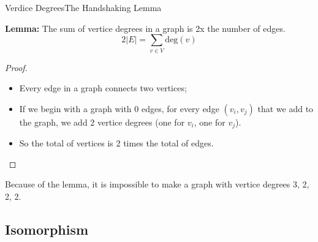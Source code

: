 \begin{frame}{Verdice Degrees}{The Handshaking Lemma}

  {\bf Lemma:} The sum of vertice degrees in a graph is 2x the number of edges.
  \begin{equation}
    2|E| = \sum_{v\in V} \text{deg}(v)
  \end{equation}

  \begin{proof}
    \begin{itemize}
      \item Every edge in a graph connects two vertices;
      \item If we begin with a graph with 0 edges, for every edge $(v_i,v_j)$ that we add to the graph, we add 2 vertice degrees (one for $v_i$, one for $v_j$).
      \item So the total of vertices is 2 times the total of edges.
    \end{itemize}
  \end{proof}\bigskip

  Because of the lemma, it is impossible to make a graph with vertice degrees 3, 2, 2, 2.
\end{frame}

\subsection{Isomorphism}


